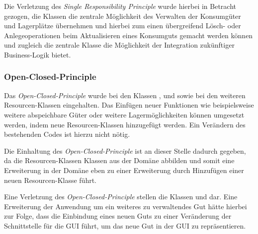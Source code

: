 Die Verletzung des \textit{Single Responsibility Principle} wurde hierbei in Betracht gezogen, die Klassen die zentrale Möglichkeit des Verwalten der Konsumgüter und Lagerplätze übernehmen und hierbei zum einen übergreifend Lösch- oder Anlegeoperationen beim Aktualisieren eines Konsumguts gemacht werden können und zugleich die zentrale Klasse die Möglichkeit der Integration zukünftiger Business-Logik bietet.

\subsubsection*{Open-Closed-Principle}
Das \textit{Open-Closed-Principle} wurde bei den Klassen \href{https://github.com/lucasmerkel/dhbw-advancedswe-programmentwurf/blob/5764d7da4cfd0562ed8e96128e92f85c30b7309d/swe_programmentwurf/consumergoods-inventory-planner/1-cip-adapters/src/main/java/de/dhbw/cip/adapters/ConsumerGoodsResource.java}{}, \href{https://github.com/lucasmerkel/dhbw-advancedswe-programmentwurf/blob/5764d7da4cfd0562ed8e96128e92f85c30b7309d/swe_programmentwurf/consumergoods-inventory-planner/1-cip-adapters/src/main/java/de/dhbw/cip/adapters/FridgeResource.java}{} und \href{https://github.com/lucasmerkel/dhbw-advancedswe-programmentwurf/blob/5764d7da4cfd0562ed8e96128e92f85c30b7309d/swe_programmentwurf/consumergoods-inventory-planner/1-cip-adapters/src/main/java/de/dhbw/cip/adapters/FoodShelfResource.java}{} sowie bei den weiteren Resourcen-Klassen eingehalten.
Das Einfügen neuer Funktionen wie beispielsweise weitere abspeichbare Güter oder weitere Lagermöglichkeiten können umgesetzt werden, indem neue Resourcen-Klassen hinzugefügt werden.
Ein Verändern des bestehenden Codes ist hierzu nicht nötig.

Die Einhaltung des \textit{Open-Closed-Principle} ist an dieser Stelle dadurch gegeben, da die Resourcen-Klassen Klassen aus der Domäne abbilden und somit eine Erweiterung in der Domäne eben zu einer Erweiterung durch Hinzufügen einer neuen Resourcen-Klasse führt. 

Eine Verletzung des \textit{Open-Closed-Principle} stellen die Klassen \href{https://github.com/lucasmerkel/dhbw-advancedswe-programmentwurf/blob/5764d7da4cfd0562ed8e96128e92f85c30b7309d/swe_programmentwurf/consumergoods-inventory-planner/0-cip-plugins/src/main/java/de/dhbw/cip/plugins/rest/ConsumerGoodsGuiController.java}{} und \href{https://github.com/lucasmerkel/dhbw-advancedswe-programmentwurf/blob/5764d7da4cfd0562ed8e96128e92f85c30b7309d/swe_programmentwurf/consumergoods-inventory-planner/0-cip-plugins/src/main/java/de/dhbw/cip/plugins/rest/StorageGuiController.java}{} dar.
Eine Erweiterung der Anwendung um ein weiteres zu verwaltendes Gut hätte hierbei zur Folge, dass die Einbindung eines neuen Guts zu einer Veränderung der Schnittstelle für die \ac{GUI} führt, um das neue Gut in der \ac{GUI} zu repräsentieren.

